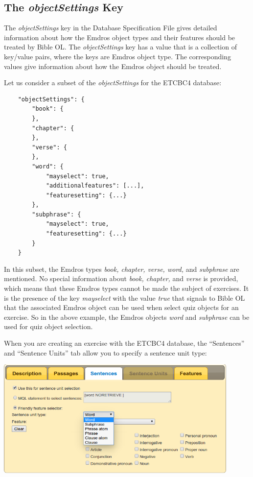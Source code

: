 \documentclass[11pt,oneside,a4paper]{memoir}
\begin{document}
\subsection{The \emph{objectSettings} Key}\label{objectsettings}

The \emph{objectSettings} key in the Database Specification File gives detailed information about
how the Emdros object types and their features should be treated by Bible OL. The
\emph{objectSettings} key has a value that is a collection of key/value pairs, where the keys are
Emdros object type. The corresponding values give information about how the Emdros object should be
treated.

Let us consider a subset of the \emph{objectSettings} for the ETCBC4 database:

\begin{lstlisting}
    "objectSettings": {
        "book": {
        },
        "chapter": {
        },
        "verse": {
        },
        "word": {
            "mayselect": true,
            "additionalfeatures": [...],
            "featuresetting": {...}
        },
        "subphrase": {
            "mayselect": true,
            "featuresetting": {...}
        }
    }
\end{lstlisting}

In this subset, the Emdros types \emph{book, chapter, verse, word,} and \emph{subphrase} are
mentioned. No special information about \emph{book, chapter,} and \emph{verse} is provided, which
means that these Emdros types cannot be made the subject of exercises. It is the presence of the
key \emph{mayselect} with the value \emph{true} that signals to Bible OL that the associated Emdros
object can be used when select quiz objects for an exercise. So in the above example, the Emdros
objects \emph{word} and \emph{subphrase} can be used for quiz object selection.

When you are creating an exercise with the ETCBC4 database, the ``Sentences'' and ``Sentence Units''
tab allow you to specify a sentence unit type:

\begin{center}
  \includegraphics[width=0.9\textwidth]{senselect.png}
\end{center}
\end{document}
